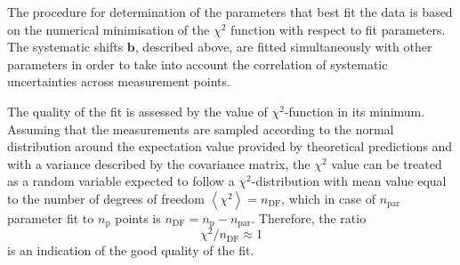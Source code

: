 The procedure for determination of the parameters that best fit the data is based on the numerical minimisation of the $\chi^2$ function with respect to fit parameters. The systematic shifts $\mathbf{b}$, described above, are fitted simultaneously with other parameters in order to take into account the correlation of systematic uncertainties across measurement points.

The quality of the fit is assessed by the value of $\chi^2$-function in its minimum. Assuming that the measurements are sampled according to the normal distribution around the expectation value provided by theoretical predictions and with a variance described by the covariance matrix, the $\chi^2$ value can be treated as a random variable expected to follow a $\chi^2$-distribution with mean value equal to the number of degrees of freedom $\left\langle \chi^2 \right\rangle = n_\text{DF}$, which in case of $n_\text{par}$ parameter fit to $n_\text{p}$ points is $n_\text{DF}=n_\text{p}-n_\text{par}$.
Therefore, the ratio
\begin{equation}
 \chi^2/n_\text{DF} \approx 1
\end{equation}
is an indication of the good quality of the fit.
